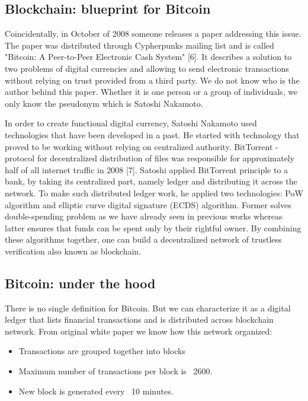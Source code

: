 \documentclass[conference,compsoc]{IEEEtran}
\begin{document}
\subsection{Blockchain: blueprint for Bitcoin}
Coincidentally, in October of 2008 someone releases a paper addressing this issue. 
The paper was distributed through Cypherpunks mailing list and is called "Bitcoin: A Peer-to-Peer Electronic Cash System" [6]. 
It describes a solution to two problems of digital currencies and allowing to send electronic transactions without relying on trust provided from a third party. 
We do not know who is the author behind this paper. 
Whether it is one person or a group of individuals, we only know the pseudonym which is Satoshi Nakamoto.    

In order to create functional digital currency, Satoshi Nakamoto used technologies that have been developed in a past. 
He started with technology that proved to be working without relying on centralized authority.    
BitTorrent - protocol for decentralized distribution of files was responsible for approximately half of all internet traffic in 2008 [7]. 
Satoshi applied BitTorrent principle to a bank, by taking its centralized part, namely ledger and distributing it across the network. 
To make such distributed ledger work, he applied two technologies: PoW algorithm and elliptic curve digital signature (ECDS) algorithm.
Former solves double-spending problem as we have already seen in previous works whereas latter ensures that funds can be spent only by their rightful owner.
By combining these algorithms together, one can build a decentralized network of trustless verification also known as blockchain. 

\subsection{Bitcoin: under the hood}
There is no single definition for Bitcoin.
But we can characterize it as a digital ledger that lists financial transactions and is distributed across blockchain network. 
From original white paper we know how this network organized: 

\begin{itemize}
  \item Transactions are grouped together into blocks 
  \item Maximum number of transactions per block is ~2600. 
  \item New block is generated every ~10 minutes.
\end{itemize}
\end{document}

